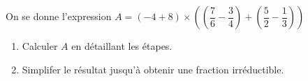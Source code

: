 \documentclass[exercice]{thedocument}%
\begin{document}
%
On se donne l'expression $A=(-4+8)\times\left(\left(\dfrac76-\dfrac34\right)+\left(\dfrac52-\dfrac13\right)\right)$
\begin{enumerate}
    \item Calculer $A$ en détaillant les étapes.
    \item Simplifer le résultat jusqu'à obtenir une fraction irréductible.
\end{enumerate}
\end{document}

